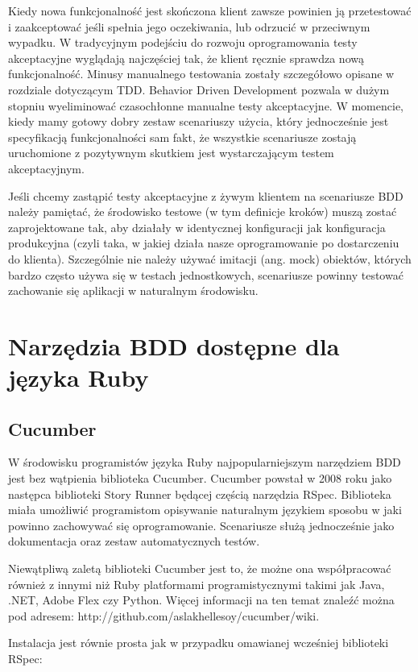       Kiedy nowa funkcjonalność jest skończona klient zawsze powinien ją przetestować i zaakceptować jeśli spełnia jego oczekiwania, lub odrzucić w przeciwnym wypadku. W tradycyjnym podejściu do rozwoju oprogramowania testy akceptacyjne wyglądają najczęściej tak, że klient ręcznie sprawdza nową funkcjonalność. Minusy manualnego testowania zostały szczegółowo opisane w rozdziale dotyczącym TDD. Behavior Driven Development pozwala w dużym stopniu wyeliminować czasochłonne manualne testy akceptacyjne. W momencie, kiedy mamy gotowy dobry zestaw scenariuszy użycia, który jednocześnie jest specyfikacją funkcjonalności sam fakt, że wszystkie scenariusze zostają uruchomione z pozytywnym skutkiem jest wystarczającym testem akceptacyjnym.
      
      Jeśli chcemy zastąpić testy akceptacyjne z żywym klientem na scenariusze BDD należy pamiętać, że środowisko testowe (w tym definicje kroków) muszą zostać zaprojektowane tak, aby działały w identycznej konfiguracji jak konfiguracja produkcyjna (czyli taka, w jakiej działa nasze oprogramowanie po dostarczeniu do klienta). Szczególnie nie należy używać imitacji (ang. mock) obiektów, których bardzo często używa się w testach jednostkowych, scenariusze powinny testować zachowanie się aplikacji w naturalnym środowisku.
      
  \section{Narzędzia BDD dostępne dla języka Ruby}
    \subsection{Cucumber}
      W środowisku programistów języka Ruby najpopularniejszym narzędziem BDD jest bez wątpienia biblioteka Cucumber. Cucumber powstał w 2008 roku jako następca biblioteki Story Runner będącej częścią narzędzia RSpec. Biblioteka miała umożliwić programistom opisywanie naturalnym językiem sposobu w jaki powinno zachowywać się oprogramowanie. Scenariusze służą jednocześnie jako dokumentacja oraz zestaw automatycznych testów. 
      
      Niewątpliwą zaletą biblioteki Cucumber jest to, że możne ona współpracować również z innymi niż Ruby platformami programistycznymi takimi jak Java, .NET, Adobe Flex czy Python. Więcej informacji na ten temat znaleźć można pod adresem: http://github.com/aslakhellesoy/cucumber/wiki.
      
      Instalacja jest równie prosta jak w przypadku omawianej wcześniej biblioteki RSpec:
      

